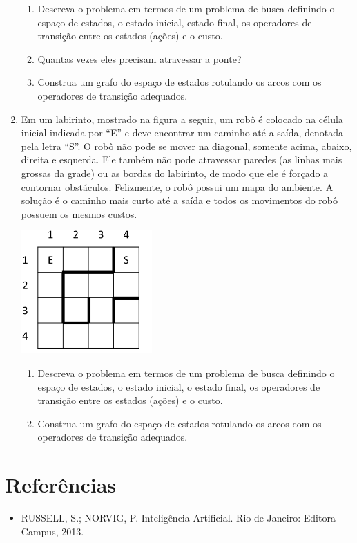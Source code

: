 \documentclass[12pt,a4paper,oneside]{article}
\begin{document}
\begin{enumerate}
		\begin{enumerate}
			\item Descreva o problema em termos de um problema de busca definindo o espaço de estados, o estado inicial, estado final, os operadores de transição entre os estados (ações) e o custo.
			\item Quantas vezes eles precisam atravessar a ponte?
			\item Construa um grafo do espaço de estados rotulando os arcos com os operadores de transição adequados.
		\end{enumerate}
	
	\item Em um labirinto, mostrado na figura a seguir, um robô é colocado na célula inicial indicada por ``E'' e deve encontrar um caminho até a saída, denotada pela letra ``S''. O robô não pode se mover na diagonal, somente acima, abaixo, direita e esquerda. Ele também não pode atravessar paredes (as linhas mais grossas da grade) ou as bordas do labirinto, de modo que ele é forçado a contornar obstáculos. Felizmente, o robô possui um mapa do ambiente. A solução é o caminho mais curto até a saída e todos os movimentos do robô possuem os mesmos custos.	
		
		\begin{center}
			\includegraphics[width=5cm]{images/fig03.png}
		\end{center}		
		
		\begin{enumerate}
			\item Descreva o problema em termos de um problema de busca definindo o espaço de estados, o estado inicial, o estado final, os operadores de transição entre os estados (ações) e o custo.
			\item Construa um grafo do espaço de estados rotulando os arcos com os operadores de transição adequados.
		\end{enumerate}
		
\end{enumerate}

\section{Referências}

\begin{itemize}
	\item RUSSELL, S.; NORVIG, P. Inteligência Artificial. Rio de Janeiro: Editora Campus, 2013.
\end{itemize}
\end{document}
